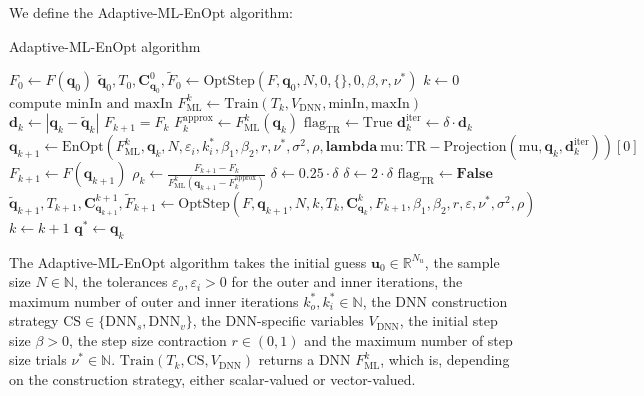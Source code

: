 We define the Adaptive-ML-EnOpt algorithm:
\begin{algorithm}[H]%
\caption{Adaptive-ML-EnOpt algorithm}
\begin{algorithmic}[1]
\State $F_0\gets F(\mathbf{q}_0)$
\State $\tilde{\mathbf{q}}_0,T_0,\mathbf{C}_{\mathbf{q}_0}^0,\tilde{F}_0\gets\mathrm{OptStep}(F,\mathbf{q}_0,N,0,\{\},0,\beta,r,\nu^*)$
\State $k\gets 0$
\State $\text{compute }\mathrm{minIn}\text{ and }\mathrm{maxIn}$
\State $F_\mathrm{ML}^k\gets\mathrm{Train}(T_k, V_\mathrm{DNN}, \mathrm{minIn}, \mathrm{maxIn})$
\State $\mathbf{d}_k\gets|\mathbf{q}_k-\tilde{\mathbf{q}}_k|$
\State $F_{k+1}=F_k$
\State $F^\mathrm{approx}_k\gets F_\mathrm{ML}^k(\mathbf{q}_k)$
\State $\mathrm{flag}_\mathrm{TR}\gets \mathrm{True}$
\State $\mathbf{d}^\mathrm{iter}_k\gets\delta\cdot\mathbf{d}_k$
\State $\mathbf{q}_{k+1}\gets\mathrm{EnOpt}(F_\mathrm{ML}^k,\mathbf{q}_k,N,\varepsilon_i,k_i^*,\beta_1, \beta_2,r,\nu^*, \sigma^2, \rho, \mathbf{lambda}\:\mathrm{mu}:\mathrm{TR-Projection}(\mathrm{mu}, \mathbf{q}_k, \mathbf{d}^\mathrm{iter}_k))[0]$
\State $F_{k+1}\gets F(\mathbf{q}_{k+1})$
\State $\rho_k\gets \frac{F_{k+1}-F_k}{F_\mathrm{ML}^k(\mathbf{q}_{k+1}-F^\mathrm{approx}_k)}$
\State $\delta\gets0.25\cdot\delta$
\EndIf
{}
\State $\delta\gets2\cdot\delta$
\EndIf
{}
\State $\mathrm{flag}_\mathrm{TR}\gets\mathbf{False}$
\EndIf
\EndWhile
\EndWhile
\State $\tilde{\mathbf{q}}_{k+1},T_{k+1},\mathbf{C}_{\mathbf{q}_{k+1}}^{k+1},\tilde{F}_{k+1}\gets\mathrm{OptStep}(F,\mathbf{q}_{k+1},N,k,T_k,\mathbf{C}_{\mathbf{q}_k}^k, F_{k+1}, \beta_1, \beta_2, r, \varepsilon ,\nu^*, \sigma^2, \rho)$
\State $k\gets k+1$
\EndWhile
\State \Return $\mathbf{q}^*\gets\mathbf{q}_k$
\EndProcedure
\end{algorithmic}
\end{algorithm}
The Adaptive-ML-EnOpt algorithm takes the initial guess $\mathbf{u}_0\in\mathbb{R}^{N_u}$, the sample size $N\in\mathbb{N}$, the tolerances $\varepsilon_o,\varepsilon_i>0$ for the outer and inner iterations, the maximum number of outer and inner iterations $k_o^*,k_i^*\in\mathbb{N}$, the DNN construction strategy $\mathrm{CS}\in\{\mathrm{DNN}_s,\mathrm{DNN}_v\}$, the DNN-specific variables $V_{\mathrm{DNN}}$, the initial step size $\beta>0$, the step size contraction $r\in(0,1)$ and the maximum number of step size trials $\nu^*\in\mathbb{N}$. $\mathrm{Train}(T_k,\mathrm{CS},V_{\mathrm{DNN}})$ returns a DNN $F_\mathrm{ML}^k$, which is, depending on the construction strategy, either scalar-valued or vector-valued.
